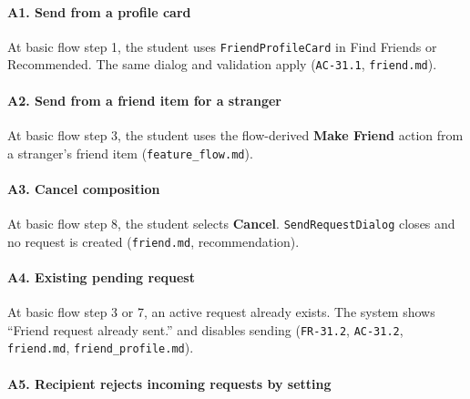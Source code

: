 \documentclass[12pt]{article}
\begin{document}
\hypertarget{sec:a1-send-from-a-profile-card}{}
\paragraph*{A1. Send from a profile card}
\par\medskip

At basic flow step 1, the student uses \texttt{FriendProfileCard} in Find Friends or Recommended. The same dialog and validation apply (\texttt{AC-31.1}, \texttt{friend.md}).
\par\medskip

\hypertarget{sec:a2-send-from-a-friend-item-for-a-stranger}{}
\paragraph*{A2. Send from a friend item for a stranger}
\par\medskip

At basic flow step 3, the student uses the flow-derived \textbf{Make Friend} action from a stranger's friend item (\texttt{feature\_flow.md}).
\par\medskip

\hypertarget{sec:a3-cancel-composition}{}
\paragraph*{A3. Cancel composition}
\par\medskip

At basic flow step 8, the student selects \textbf{Cancel}. \texttt{SendRequestDialog} closes and no request is created (\texttt{friend.md}, recommendation).
\par\medskip

\hypertarget{sec:a4-existing-pending-request}{}
\paragraph*{A4. Existing pending request}
\par\medskip

At basic flow step 3 or 7, an active request already exists. The system shows “Friend request already sent.” and disables sending (\texttt{FR-31.2}, \texttt{AC-31.2}, \texttt{friend.md}, \texttt{friend\_profile.md}).
\par\medskip

\hypertarget{sec:a5-recipient-rejects-incoming-requests-by-setting}{}
\paragraph*{A5. Recipient rejects incoming requests by setting}
\par\medskip
\end{document}
